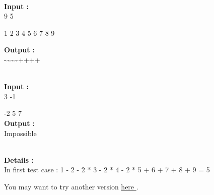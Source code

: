  

\textbf{Input : }
\\9 5

1 2 3 4 5 6 7 8 9

\textbf{Output : }
\\-\textasciitilde\textasciitilde\textasciitilde++++


\\\textbf{Input : }
\\3 -1

-2 5 7
\\\textbf{Output : }
\\Impossible


\\\textbf{Details : }
\\In first test case : 1 - 2 - 2 * 3 - 2 * 4 - 2 * 5 + 6 + 7 + 8 + 9 = 5

You may want to try another version \href{/problems/show/BLOPER}{ here } .